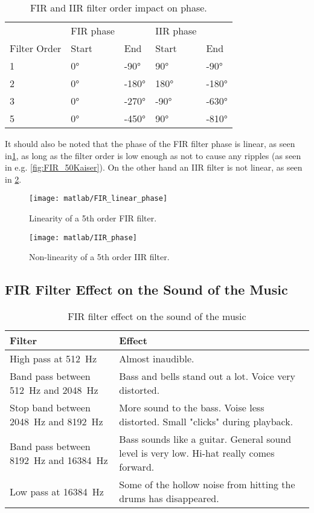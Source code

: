 \begin{table}[!htb]
	\caption{FIR and IIR filter order impact on phase.}
	\label{tab:phase}
	\begin{tabularx}{\textwidth}{X | X X | X X}
		& FIR phase & & IIR phase & \\
		Filter Order & Start & End & Start & End \\
		\midrule
		1 & \ang{0} & \ang{-90} & \ang{90} & \ang{-90} \\
		2 & \ang{0} & \ang{-180} & \ang{180} & \ang{-180} \\
		3 & \ang{0} & \ang{-270} & \ang{-90} & \ang{-630} \\
		5 & \ang{0} & \ang{-450} & \ang{90} & \ang{-810} \\
	\end{tabularx}
\end{table}

It should also be noted that the phase of the FIR filter phase is linear, as seen in\cref{fig:FIR_linearphase}, as long as the filter order is low enough as not to cause any ripples (as seen in e.g. \cref{fig:FIR_50Kaiser}). On the other hand an IIR filter is not linear, as seen in \cref{fig:IIR_phase}.

\begin{figure}[!htb]
	\centering
	\texttt{[image: matlab/FIR\_linear\_phase]}
	\caption{Linearity of a 5th order FIR filter.}
	\label{fig:FIR_linearphase}
\end{figure}

\begin{figure}[!htb]
	\centering
	\texttt{[image: matlab/IIR\_phase]}
	\caption{Non-linearity of a 5th order IIR filter.}
	\label{fig:IIR_phase}
\end{figure}

\clearpage

\subsection{FIR Filter Effect on the Sound of the Music}
\begin{table}[!htb]
	\caption{FIR filter effect on the sound of the music}
	\label{tab:music}
	\begin{tabularx}{\textwidth}{X X}
		Filter & Effect \\
		\midrule
		High pass at \SI{512}{\hertz} & Almost inaudible. \\
		Band pass between \SI{512}{\hertz} and \SI{2048}{\hertz} & Bass and bells stand out a lot. Voice very distorted.\\
		Stop band between \SI{2048}{\hertz} and \SI{8192}{\hertz} & More sound to the bass. Voise less distorted. Small "clicks" during playback. \\
		Band pass between \SI{8192}{\hertz} and \SI{16384}{\hertz} & Bass sounds like a guitar. General sound level is very low. Hi-hat really comes forward.\\
		Low pass at \SI{16384}{\hertz} & Some of the hollow noise from hitting the drums has disappeared.\\
	\end{tabularx}
\end{table}

